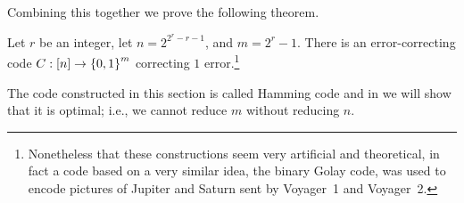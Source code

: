 Combining this together we prove the following theorem.
\begin{theorem}
  Let $r$ be an integer, let $n = 2^{2^r - r - 1}$, and $m = 2^r - 1$.
  There is an error-correcting code $C : \range{n} \to \set{0, 1}^m$
  correcting $1$ error.\footnote{%
    Nonetheless that these constructions seem very artificial and theoretical,
    in fact a code based on a very similar idea, the binary Golay code, was used
    to encode pictures of Jupiter and Saturn sent by Voyager~1 and Voyager~2.
  }
\end{theorem}
The code constructed in this section is called Hamming code and in
 we will show that it is optimal; i.e., we cannot reduce
$m$ without reducing $n$.
